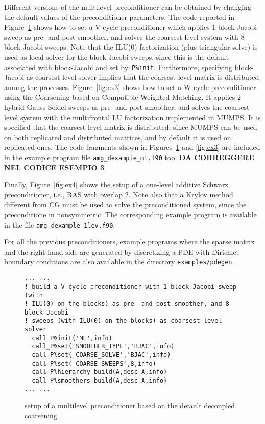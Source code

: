 Different versions of the multilevel preconditioner can be obtained by changing
the default values of the preconditioner parameters. The code reported in
Figure~\ref{fig:ex2} shows how to set a V-cycle preconditioner
which applies 1 block-Jacobi sweep as pre- and post-smoother,
and solves the coarsest-level system with 8 block-Jacobi sweeps.
Note that the ILU(0) factorization (plus triangular solve) is used as
local solver for the block-Jacobi sweeps, since this is the default associated
with block-Jacobi and set by~\verb|P%init|.
Furthermore, specifying block-Jacobi as coarsest-level
solver implies that the coarsest-level matrix is distributed
among the processes.
Figure~\ref{fig:ex3} shows how to set a W-cycle preconditioner using
the Coarsening based on Compatible Weighted Matching. It applies 
2 hybrid Gauss-Seidel sweeps as pre- and post-smoother,
and solves the coarsest-level system with the multifrontal LU factorization
implemented in MUMPS. It is specified that the coarsest-level
matrix is distributed, since MUMPS can be used on both
replicated and distributed matrices, and by default
it is used on replicated ones.
The code fragments shown in Figures~\ref{fig:ex2} and \ref{fig:ex3} are
included in the example program file \verb|amg_dexample_ml.f90| too. \textbf{DA CORREGGERE NEL CODICE ESEMPIO 3}

Finally, Figure~\ref{fig:ex4} shows the setup of a one-level
additive Schwarz preconditioner, i.e., RAS with overlap 2.
Note also that a Krylov method different from CG must be used to solve
the preconditioned system, since the preconditione in nonsymmetric.
The corresponding example program is available in the file
\verb|amg_dexample_1lev.f90|.

For all the previous preconditioners, example programs where the sparse matrix and
the right-hand side are generated by discretizing a PDE with Dirichlet
boundary conditions are also available in the directory \verb|examples/pdegen|.

\begin{figure}[tbh]
\begin{center}
\begin{minipage}{.90\textwidth}
{\small
\begin{verbatim}
... ...
! build a V-cycle preconditioner with 1 block-Jacobi sweep (with
! ILU(0) on the blocks) as pre- and post-smoother, and 8  block-Jacobi
! sweeps (with ILU(0) on the blocks) as coarsest-level solver
  call P%init('ML',info)
  call_P%set('SMOOTHER_TYPE','BJAC',info)
  call P%set('COARSE_SOLVE','BJAC',info)
  call P%set('COARSE_SWEEPS',8,info)
  call P%hierarchy_build(A,desc_A,info)
  call P%smoothers_build(A,desc_A,info)
... ...
\end{verbatim}
}
\end{minipage}

\caption{setup of a multilevel preconditioner based on the default decoupled coarsening\label{fig:ex2}}
\end{center}
\end{figure}

